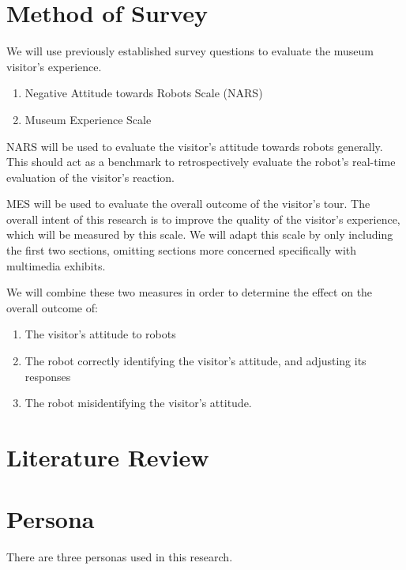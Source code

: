 \documentclass[conference]{IEEEtran}
\begin{document}
\section{Method of Survey}

We will use previously established survey questions to evaluate the museum visitor's experience.

\begin{enumerate}
    \item Negative Attitude towards Robots Scale (NARS)\cite{syrdal1}
    \item Museum Experience Scale\cite{othman1}
\end{enumerate}

NARS will be used to evaluate the visitor's attitude towards robots generally.  This should act as a benchmark to retrospectively evaluate the robot's real-time evaluation of the visitor's reaction.

MES will be used to evaluate the overall outcome of the visitor's tour.  The overall intent of this research is to improve the quality of the visitor's experience, which will be measured by this scale.  We will adapt this scale by only including the first two sections, omitting sections more concerned specifically with multimedia exhibits.

We will combine these two measures in order to determine the effect on the overall outcome of:

\begin{enumerate}
    \item The visitor's attitude to robots
    \item The robot correctly identifying the visitor's attitude, and adjusting its responses
    \item The robot misidentifying the visitor's attitude.
\end{enumerate}

\section{Literature Review}


\newpage
\appendices
\newpage
\section{Persona}
\label{Appendix-Persona}
There are three personas used in this research. 



\end{document}
